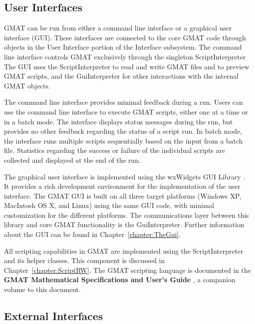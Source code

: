 \subsection{User Interfaces}

GMAT can be run from either a command line interface or a graphical user interface (GUI).  These
interfaces are connected to the core GMAT code through objects in the User Interface
portion of the Interface subsystem. The command line interface controls GMAT exclusively through
the singleton ScriptInterpreter  The GUI uses the ScriptInterpreter to read and write GMAT files
and to preview GMAT scripts, and the GuiInterpreter for other interactions with the internal GMAT
objects.

The command line interface provides minimal feedback during a run.  Users can use the command line
interface to execute GMAT scripts, either one at a time or in a batch mode.  The interface displays
status messages during the run, but provides no other feedback regarding the status of a script
run.  In batch mode, the interface runs multiple scripts sequentially based on the input from a
batch file.  Statistics regarding the success or failure of the individual scripts are collected
and displayed at the end of the run.

The graphical user interface is implemented using the wxWidgets GUI Library \cite{wxWidgets}.
It provides a rich development environment for the implementation of the user interface.  The GMAT
GUI is built on all three target platforms (Windows XP, MacIntosh OS X, and Linux) using the same
GUI code, with minimal customization for the different platforms.  The communications layer between
this library and core GMAT functionality is the GuiInterpreter.  Further information about the GUI
can be found in Chapter~\ref{chapter:TheGui}.

All scripting capabilities in GMAT are implemented using the ScriptInterpreter and its helper
classes.  This component is discussed in Chapter~\ref{chapter:ScriptRW}.  The GMAT scripting
language is documented in the \textbf{GMAT Mathematical Specifications and User's Guide}
\cite{mathSpec}, a companion volume to this document.

\subsection{External Interfaces}



